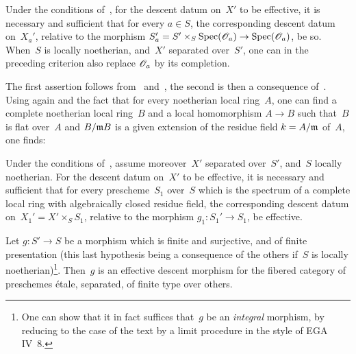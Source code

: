 \begin{corollary}
\label{IX.4.5}
Under the conditions of~, for the descent
datum on~$X'$ to be effective, it is necessary and sufficient that for every
$a\in S$, the corresponding descent datum on~$X_a'$,
relative to the morphism
$S_a'=S'\times_S\Spec(\cal{O}_a)\to\Spec(\cal{O}_a)$, be so.
When~$S$ is locally noetherian, and~$X'$ separated
over~$S'$, one can in the preceding criterion also replace
$\cal{O}_a$ by its completion.
\end{corollary}

The
first assertion follows from~ and~, the
second is then a consequence of~. Using
 again and the fact that for every noetherian local
ring~$A$, one can find a complete noetherian local
ring~$B$ and a local homomorphism $A\to B$ such that~$B$ is flat
over~$A$ and $B/\mathfrak{m}B$ is a given extension of the residue
field $k=A/\mathfrak{m}$ of~$A$, one finds:

\begin{corollary}
\label{IX.4.6}
Under the conditions of~, assume moreover~$X'$
separated over~$S'$, and~$S$ locally noetherian. For the
descent datum on~$X'$ to be effective, it is necessary and sufficient
that for every prescheme~$S_1$ over~$S$ which is the spectrum of a
complete local ring with algebraically closed residue field, the
corresponding descent datum on~$X_1'=X'\times_S S_1$,
relative to the morphism $g_1\colon S_1'\to S_1$, be effective.
\end{corollary}

\begin{theorem}
\label{IX.4.7}
Let $g\colon S'\to S$ be a morphism which is finite and surjective, and of
finite presentation (this last hypothesis being a
consequence of the others if~$S$ is locally
noetherian)\footnote{One can show that it in fact suffices that~$g$
be an \emph{integral} morphism, by reducing to the case of the text by a
limit procedure in the style of EGA IV~8.}.
Then~$g$ is an effective descent morphism for the fibered
category of preschemes \'etale, separated, of
finite type over others.
\end{theorem}

